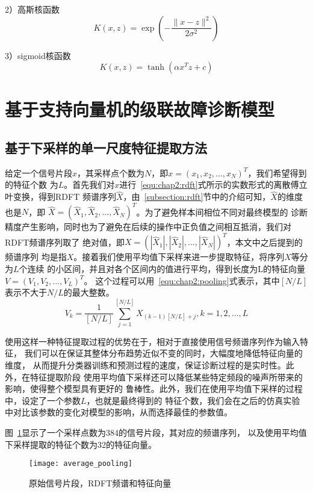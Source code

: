 2）高斯核函数
\begin{equation}
  \label{equ:chap2:gauss_kernel}
  K(x,z)=\exp\left(-\frac{\|x-z\|^2}{2\sigma^2}\right)
\end{equation}

3）sigmoid核函数
\begin{equation}
  \label{equ:chap2:sigmoid_kernel}
  K(x,z)=\tanh(\alpha x^Tz+c)
\end{equation}

\section{基于支持向量机的级联故障诊断模型}

\subsection{基于下采样的单一尺度特征提取方法}

给定一个信号片段$x$，其采样点个数为$N$，即$x=(x_1,x_2,...,x_N)^T$，我们希望得到的特征个数
为$L$。首先我们对$x$进行~\ref{equ:chap2:rdft}式所示的实数形式的离散傅立叶变换，得到RDFT
频谱序列$\hat{X}$，由~\ref{subsection:rdft}节中的介绍可知，$\hat{X}$的维度也是$N$，即
$\hat{X} = (\hat{X}_1, \hat{X}_2, ..., \hat{X}_N)^T$。为了避免样本间相位不同对最终模型的
诊断精度产生影响，同时也为了避免在后续的操作中正负值之间相互抵消，我们对RDFT频谱序列取了
绝对值，即$X = (|\hat{X}_1|, |\hat{X}_2|, ..., |\hat{X}_N|)^T$，本文中之后提到的频谱序列
均是指$X$。接着我们使用平均值下采样来进一步提取特征，将序列$X$等分为$L$个连续
的小区间，并且对各个区间内的值进行平均，得到长度为L的特征向量$V=(V_1,V_2,...,V_L)^T$。
这个过程可以用~\ref{equ:chap2:pooling}式表示，其中$[N/L]$表示不大于$N/L$的最大整数。
\begin{equation}
  \label{equ:chap2:pooling}
  V_k=\frac{1}{[N/L]}\sum_{j=1}^{[N/L]}X_{(k-1)[N/L]+j}, k=1,2,...,L
\end{equation}

使用这样一种特征提取过程的优势在于，相对于直接使用信号频谱序列作为输入特征，
我们可以在保证其整体分布趋势近似不变的同时，大幅度地降低特征向量的维度，
从而提升分类器训练和预测过程的速度，保证诊断过程的是实时性。此外，在特征提取阶段
使用平均值下采样还可以降低某些特定频段的噪声所带来的影响，使得整个模型具有更好的
鲁棒性。此外，我们在使用平均值下采样的过程中，设定了一个参数$L$，也就是最终得到的
特征个数，我们会在之后的仿真实验中对比该参数的变化对模型的影响，从而选择最佳的参数值。

图~\ref{fig:average_pooling}显示了一个采样点数为384的信号片段，其对应的频谱序列，
以及使用平均值下采样提取的特征个数为32的特征向量。
\begin{figure}[ht] %
  \centering
  \texttt{[image: average\_pooling]}
  \caption{原始信号片段，RDFT频谱和特征向量}
  \label{fig:average_pooling}
\end{figure}

